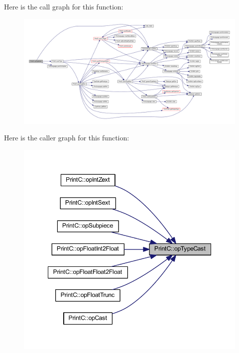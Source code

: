 Here is the call graph for this function\+:
\nopagebreak
\begin{figure}[H]
\begin{center}
\leavevmode
\includegraphics[width=350pt]{class_print_c_a58330f960ce5acf171b06bde584b5c4a_cgraph}
\end{center}
\end{figure}
Here is the caller graph for this function\+:
\nopagebreak
\begin{figure}[H]
\begin{center}
\leavevmode
\includegraphics[width=348pt]{class_print_c_a58330f960ce5acf171b06bde584b5c4a_icgraph}
\end{center}
\end{figure}
\mbox{\label{class_print_c_ad15ce25f4039ab09de56be539724f5f7}} 
